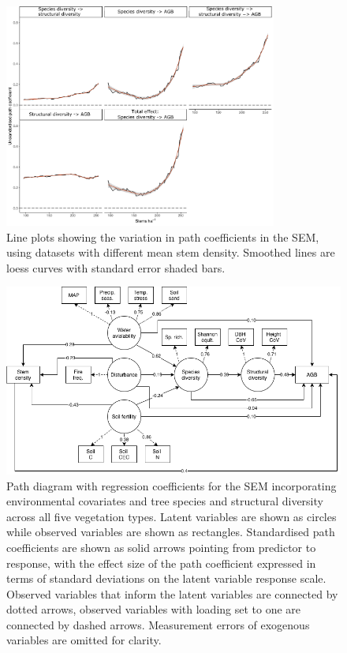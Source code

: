 \documentclass[11pt,a4paper]{article}
\begin{document}
\begin{figure}[H]
\centering
	\includegraphics[width=0.8\textwidth]{sem_struc_stems_ha}
	\caption{Line plots showing the variation in path coefficients in the SEM, using datasets with different mean stem density. Smoothed lines are loess curves with standard error shaded bars.}
	\label{sem_struc_stems_ha}
\end{figure}

\begin{figure}[H]
\centering
	\includegraphics[width=\textwidth]{full}
	\caption{Path diagram with regression coefficients for the SEM incorporating environmental covariates and tree species and structural diversity across all five vegetation types. Latent variables are shown as circles while observed variables are shown as rectangles. Standardised path coefficients are shown as solid arrows pointing from predictor to response, with the effect size of the path coefficient expressed in terms of standard deviations on the latent variable response scale. Observed variables that inform the latent variables are connected by dotted arrows, observed variables with loading set to one are connected by dashed arrows. Measurement errors of exogenous variables are omitted for clarity.}
	\label{full_mod}
\end{figure}
\end{document}
